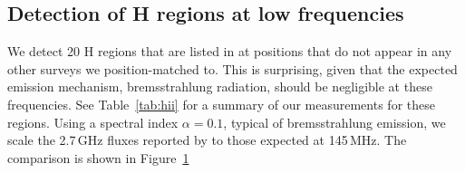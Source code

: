 \documentclass[useAMS,usenatbib]{mn2e}
\begin{document}
\begin{figure}
\label{fig:comparisonscatters}
\end{figure}

\subsection{Detection of {H} regions at low frequencies}
We detect 20 {H} regions that are listed in \cite{Paladini.03} at positions that do not appear in any other surveys we position-matched to. This is surprising, given that the expected emission mechanism, bremsstrahlung radiation, should be negligible at these frequencies. See Table~\ref{tab:hii} for a summary of our measurements for these regions. Using a spectral index $\alpha=0.1$, typical of bremsstrahlung emission, we scale the 2.7\,GHz fluxes reported by \cite{Paladini.03} to those expected at 145\,MHz. The comparison is shown in Figure~\ref{fig:comparisonscatters}
\end{document}
